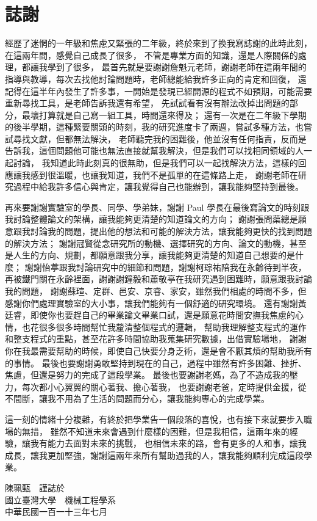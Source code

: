 \chapter{誌謝}
    \fontsize{12pt}{18pt}\selectfont
    經歷了迷惘的一年級和焦慮又緊張的二年級，終於來到了換我寫誌謝的此時此刻，在這兩年間，感覺自己成長了很多，
    不管是專業方面的知識，還是人際關係的處理，都讓我學到了很多，
    最首先就是要謝謝詹魁元老師，謝謝老師在這兩年間的指導與教導，每次去找他討論問題時，老師總能給我許多正向的肯定和回復，
    還記得在這半年內發生了許多事，一開始是發現已經開源的程式不如預期，可能需要重新尋找工具，是老師告訴我還有希望，
    先試試看有沒有辦法改掉出問題的部分，最壞打算就是自己寫一組工具，時間還來得及；
    還有一次是在二年級下學期的後半學期，這種緊要關頭的時刻，我的研究進度卡了兩週，嘗試多種方法，也嘗試尋找文獻，但都無法解決，
    老師聽完我的困難後，他並沒有任何指責，反而是告訴我，這個問題他可能也無法直接就幫我解決，但是我們可以找相同領域的人一起討論，
    我知道此時此刻真的很無助，但是我們可以一起找解決方法，這樣的回應讓我感到很溫暖，也讓我知道，我們不是孤單的在這條路上走，
    謝謝老師在研究過程中給我許多信心與肯定，讓我覺得自己也能辦到，讓我能夠堅持到最後。

    再來要謝謝實驗室的學長、同學、學弟妹，謝謝 Paul 學長在最後寫論文的時刻跟我討論整體論文的架構，讓我能夠更清楚的知道論文的方向；
    謝謝張問蕖總是願意跟我討論我的問題，提出他的想法和可能的解決方法，讓我能夠更快的找到問題的解決方法；
    謝謝冠賢從念研究所的動機、選擇研究的方向、論文的動機，甚至是人生的方向、規劃，都願意跟我分享，讓我能夠更清楚的知道自己想要的是什麼；
    謝謝怡葶跟我討論研究中的細節和問題，謝謝柯琮祐陪我在永齡待到半夜，再被鐵門關在永齡裡面，謝謝謝鐘毅和蕭敬亭在我研究遇到困難時，願意跟我討論我的問題，
    謝謝蘇瑄、定群、邑安、京睿、家安，雖然我們相處的時間不多，但感謝你們處理實驗室的大小事，讓我們能夠有一個舒適的研究環境。
    還有謝謝黃廷睿，即使你也要趕自己的畢業論文畢業口試，還是願意花時間安撫我焦慮的心情，也花很多很多時間幫忙我釐清整個程式的邏輯，
    幫助我理解整支程式的運作和整支程式的重點，甚至花許多時間協助我蒐集研究數據，出借實驗場地，
    謝謝你在我最需要幫助的時候，即使自己快要分身乏術，還是會不厭其煩的幫助我所有的事情。
    最後也要謝謝勇敢堅持到現在的自己，過程中雖然有許多困難、挫折、焦慮，但還是努力的完成了這段學業。
    最後也要謝謝老媽，為了不造成我的壓力，每次都小心翼翼的關心著我、擔心著我，
    也要謝謝老爸，定時提供金援，從不間斷，讓我不用為了生活的問題而分心，讓我能夠專心的完成學業。
    
    這一刻的情緒十分複雜，有終於把學業告一個段落的喜悅，也有接下來就要步入職場的無措，
    雖然不知道未來會遇到什麼樣的困難，但是我相信，這兩年來的經驗，讓我有能力去面對未來的挑戰，
    也相信未來的路，會有更多的人和事，讓我成長，讓我更加堅強，謝謝這兩年來所有幫助過我的人，讓我能夠順利完成這段學業。

    \begin{flushright}
        陳珮甄　謹誌於\\
        國立臺灣大學　機械工程學系\\
        中華民國一百一十三年七月
    \end{flushright}
 
